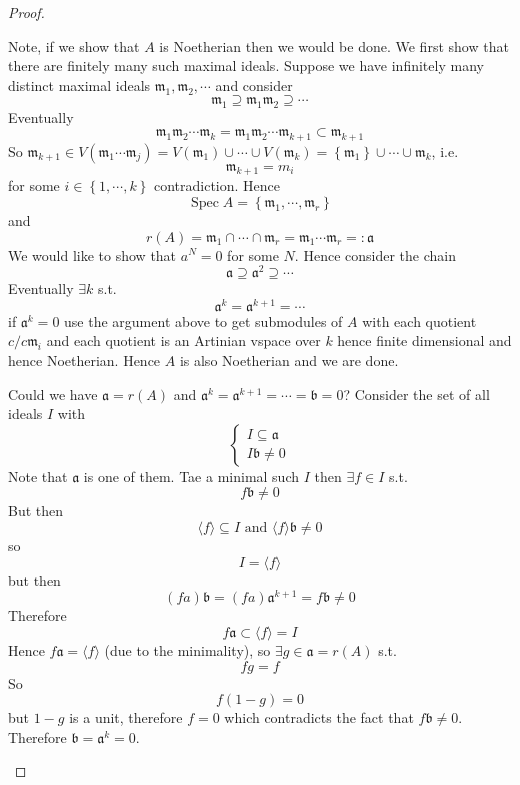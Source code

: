 \documentclass[11pt,a4paper]{article}
\theoremstyle{definition}
\theoremstyle{plain}
\theoremstyle{remark}
\renewcommand{\set}[1]{\left\{ #1 \right\}}
\newcommand{\angles}[1]{\langle #1 \rangle}
\newcommand{\Spec}{\operatorname{Spec}}
\begin{document}
\begin{proof}
\begin{itemize}
        Note, if we show that $A$ is Noetherian then we would be done. We first show that there 
        are finitely many such maximal ideals. Suppose we have infinitely many distinct maximal ideals $\mathfrak{m}_1, \mathfrak{m}_2, \cdots$ 
        and consider 
        $$\mathfrak{m}_1 \supseteq \mathfrak{m}_1 \mathfrak{m}_2 \supseteq \cdots$$
        Eventually 
        $$\mathfrak{m}_1 \mathfrak{m}_2 \cdots \mathfrak{m}_{k} = \mathfrak{m}_1 \mathfrak{m}_2 \cdots \mathfrak{m}_{k+1} \subset \mathfrak{m}_{k+1}$$
        So $\mathfrak{m}_{k+1} \in V(\mathfrak{m}_1 \cdots \mathfrak{m}_j) = V(\mathfrak{m}_1) \cup \cdots \cup V(\mathfrak{m}_k) = \set{\mathfrak{m}_1} \cup \cdots \cup \mathfrak{m}_k$, 
        i.e. 
        $$\mathfrak{m}_{k+1} = m_i$$
        for some $i \in \set{1, \cdots, k}$ contradiction. Hence 
        $$\Spec A = \set{\mathfrak{m}_1, \cdots, \mathfrak{m}_r}$$
        and 
        $$r(A) = \mathfrak{m}_1 \cap \cdots \cap \mathfrak{m}_r = \mathfrak{m}_1 \cdots \mathfrak{m}_r =: \mathfrak{a}$$
        We would like to show that $a^N = 0$ for some $N$. Hence consider the chain 
        $$\mathfrak{a} \supseteq \mathfrak{a}^2 \supseteq \cdots$$
        Eventually $\exists k$ s.t. 
        $$\mathfrak{a}^k = \mathfrak{a}^{k+1} = \cdots$$
        if $\mathfrak{a}^k = 0$ use the argument above to get submodules of $A$ with each quotient 
        $c/c \mathfrak{m}_i$ and each quotient is an Artinian vspace over $k$ hence finite dimensional and hence Noetherian. 
        Hence $A$ is also Noetherian and we are done. 

        Could we  have $\mathfrak{a} = r(A)$ and $\mathfrak{a}^k = \mathfrak{a}^{k+1} = \cdots= \mathfrak{b} = 0$? 
        Consider the set of all ideals $I$ with 
        $$\begin{cases}
            I \subseteq \mathfrak{a} \\ 
            I \mathfrak{b} \ne 0
        \end{cases}$$
        Note that $\mathfrak{a}$ is one of them. Tae a minimal such $I$ then $\exists f \in I$ s.t. 
        $$f \mathfrak{b} \ne 0$$
        But then 
        $$\angles{f} \subseteq I \text{ and } \angles{f} \mathfrak{b} \ne 0$$
        so 
        $$I = \angles{f}$$
        but then 
        $$(fa) \mathfrak{b} = (fa) \mathfrak{a}^{k+1} = f\mathfrak{b} \ne 0$$
        Therefore 
        $$f \mathfrak{a} \subset \angles{f} = I$$
        Hence $f \mathfrak{a} = \angles{f}$ (due to the minimality), so $\exists g \in \mathfrak{a} = r(A)$ s.t. 
        $$fg = f$$
        So 
        $$f(1-g) = 0$$
        but $1-g$ is a unit, therefore $f = 0$ which contradicts the fact that $f \mathfrak{b} \ne 0$. 
        Therefore $\mathfrak{b} = \mathfrak{a}^k = 0$. 
    \end{itemize}
\end{proof}
\end{document}
